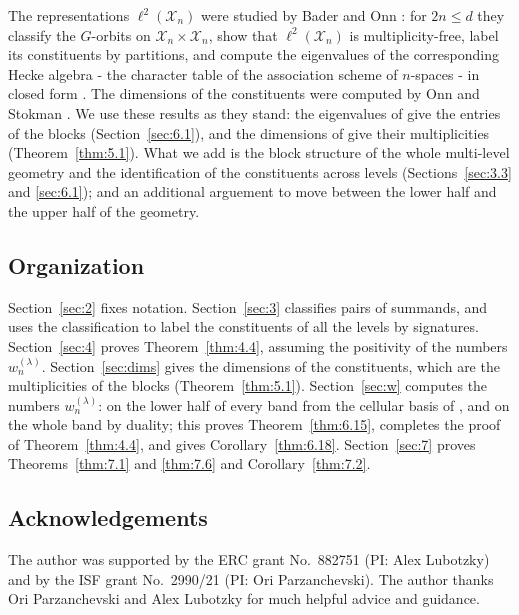 \documentclass[11pt]{article}
\numberwithin{equation}{section}
\theoremstyle{plain}
\theoremstyle{definition}
\begin{document}
The representations $\ell^2(\mathcal{X}_n)$ were studied by Bader and Onn \cite{BO07,BO12}: for
$2n\le d$ they classify the $G$-orbits on $\mathcal{X}_n\times \mathcal{X}_n$, show that $\ell^2(\mathcal{X}_n)$ is
multiplicity-free, label its constituents by partitions, and compute the eigenvalues of
the corresponding Hecke algebra - the character table of the association scheme of
$n$-spaces - in closed form \cite{BO12}. The dimensions of the constituents were computed
by Onn and Stokman \cite{OS06}. We use these results as they stand: the eigenvalues of
\cite{BO12} give the entries of the blocks (Section~\ref{sec:6.1}), and the dimensions of \cite{OS06} give
their multiplicities (Theorem~\ref{thm:5.1}). What we add is the block structure of the whole
multi-level geometry and the identification of the constituents across levels
(Sections~\ref{sec:3.3} and \ref{sec:6.1}); and an additional arguement to move between the lower half and the upper half of the geometry.

\subsection{Organization}\label{sec:1.5}

Section~\ref{sec:2} fixes notation. Section~\ref{sec:3} classifies pairs of summands, and uses the
classification to label the constituents of all the levels by signatures. Section~\ref{sec:4}
proves Theorem~\ref{thm:4.4}, assuming the positivity of the numbers $w^{(\lambda)}_n$.
Section~\ref{sec:dims} gives the dimensions of the constituents, which are the
multiplicities of the blocks (Theorem~\ref{thm:5.1}). Section~\ref{sec:w} computes the numbers
$w^{(\lambda)}_n$: on the lower half of every band from the cellular basis of \cite{BO12}, and
on the whole band by duality; this proves Theorem~\ref{thm:6.15}, completes the proof of
Theorem~\ref{thm:4.4}, and gives Corollary~\ref{thm:6.18}. Section~\ref{sec:7} proves
Theorems~\ref{thm:7.1} and \ref{thm:7.6} and Corollary~\ref{thm:7.2}.

\subsection{Acknowledgements}\label{sec:ack}

The author was supported by the ERC grant No.~882751 (PI: Alex Lubotzky) and by the ISF
grant No.~2990/21 (PI: Ori Parzanchevski).
The author thanks Ori Parzanchevski and Alex Lubotzky for much helpful advice and guidance.
\end{document}
